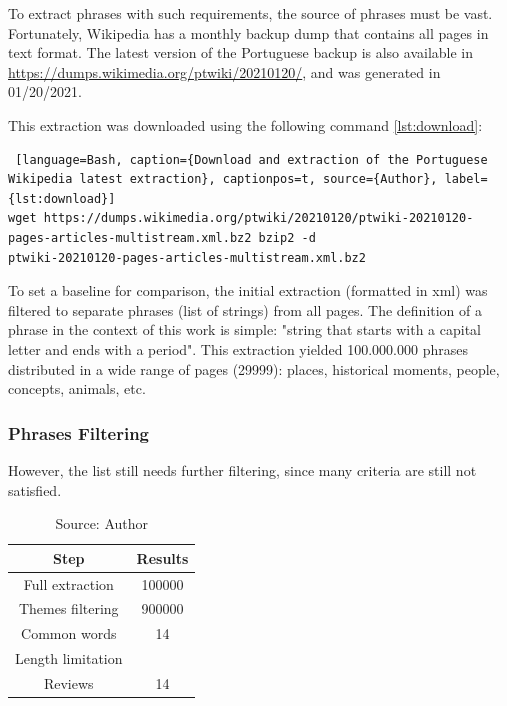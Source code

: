 To extract phrases with such requirements, the source of phrases must be vast. Fortunately, Wikipedia has a monthly backup dump that contains all pages in text format. The latest version of the Portuguese backup is also available in \url{https://dumps.wikimedia.org/ptwiki/20210120/}, and was generated in 01/20/2021.

This extraction was downloaded using the following command \ref{lst:download}:

\begin{lstlisting} [language=Bash, caption={Download and extraction of the Portuguese Wikipedia latest extraction}, captionpos=t, source={Author}, label={lst:download}]
wget https://dumps.wikimedia.org/ptwiki/20210120/ptwiki-20210120-pages-articles-multistream.xml.bz2 bzip2 -d
ptwiki-20210120-pages-articles-multistream.xml.bz2
\end{lstlisting}

To set a baseline for comparison, the initial extraction (formatted in xml) was filtered to separate phrases (list of strings) from all pages. The definition of a phrase in the context of this work is simple: "string that starts with a capital letter and ends with a period". This extraction yielded 100.000.000 phrases distributed in a wide range of pages (29999): places, historical moments, people, concepts, animals, etc.

\subsubsection{Phrases Filtering}

However, the list still needs further filtering, since many criteria are still not satisfied.

\begin{table}[h]
    \centering
    \caption{Phrases Filtering Results of the Portuguese Wikipedia (extracted 01/20/2021)}
    \label{tab:filtering}
    \begin{tabular}{|c|c|}
        \hline Step & Results \\ \hline
        Full extraction & 100000 \\ \hline
        Themes filtering & 900000 \\ \hline
        Common words & 14 \\ \hline
        Length limitation &  \\ \hline
        Reviews & 14 \\ \hline
    \end{tabular}
    \caption*{Source: Author}
\end{table}

